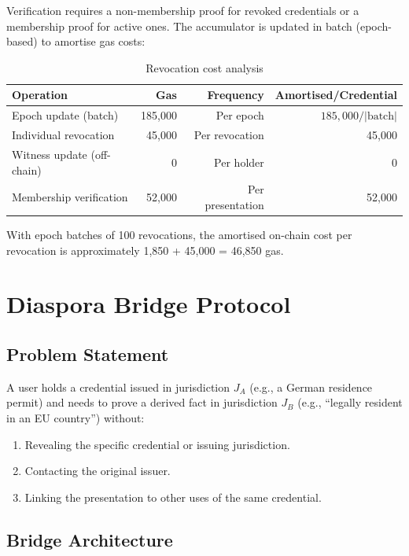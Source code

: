 \documentclass[11pt,a4paper]{article}
\begin{document}
Verification requires a non-membership proof for revoked credentials or a membership
proof for active ones. The accumulator is updated in batch (epoch-based) to amortise
gas costs:

\begin{table}[h]
\centering
\caption{Revocation cost analysis}
\label{tab:revocation-costs}
\begin{tabular}{lrrr}
\toprule
\textbf{Operation} & \textbf{Gas} & \textbf{Frequency} & \textbf{Amortised/Credential} \\
\midrule
Epoch update (batch) & 185{,}000 & Per epoch & $185{,}000 / |\text{batch}|$ \\
Individual revocation & 45{,}000 & Per revocation & 45{,}000 \\
Witness update (off-chain) & 0 & Per holder & 0 \\
Membership verification & 52{,}000 & Per presentation & 52{,}000 \\
\bottomrule
\end{tabular}
\end{table}

With epoch batches of 100 revocations, the amortised on-chain cost per revocation
is approximately 1{,}850 + 45{,}000 = 46{,}850 gas.

\section{Diaspora Bridge Protocol}
\label{sec:bridges}

\subsection{Problem Statement}

A user holds a credential issued in jurisdiction $J_A$ (e.g., a German residence
permit) and needs to prove a derived fact in jurisdiction $J_B$ (e.g., ``legally
resident in an EU country'') without:
\begin{enumerate}[label=(\roman*)]
    \item Revealing the specific credential or issuing jurisdiction.
    \item Contacting the original issuer.
    \item Linking the presentation to other uses of the same credential.
\end{enumerate}

\subsection{Bridge Architecture}
\end{document}
